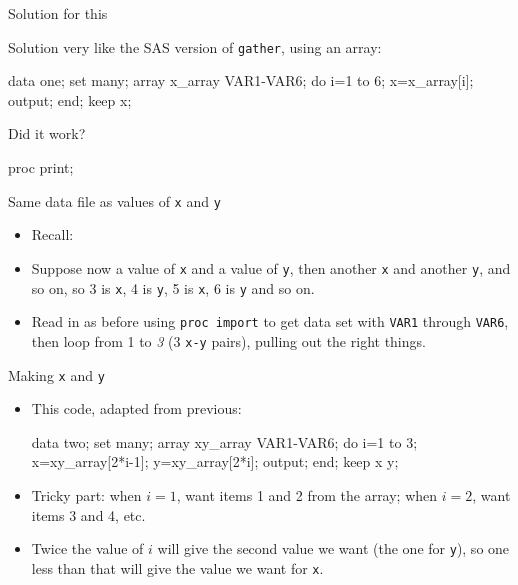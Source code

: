 \documentclass[unknownkeysallowed]{beamer}\usepackage[]{graphicx}\usepackage[]{color}
\begin{document}
\begin{frame}[fragile]{Solution for this}

  Solution very like the SAS version of \texttt{gather}, using an array:

  \begin{Datastep}
data one;
  set many;
  array x_array VAR1-VAR6;
  do i=1 to 6;
    x=x_array[i];
    output;
  end;
  keep x;
  \end{Datastep}

\end{frame}

\begin{frame}[fragile]{Did it work?}
    
    \begin{Sascode}[store=mb]
proc print;      
    \end{Sascode}
    
    
\end{frame}

\begin{frame}[fragile]{Same data file as values of \texttt{x} and \texttt{y}}
  
  \begin{itemize}
  \item   Recall:
  

\item Suppose now a value of \texttt{x} and a value of \texttt{y}, then
another \texttt{x} and another \texttt{y}, and so on, so 3 is
\texttt{x}, 4 is \texttt{y}, 5 is \texttt{x}, 6 is \texttt{y} and so on.

\item Read in as before using \texttt{proc import} to get data set
  with \texttt{VAR1} through \texttt{VAR6}, then loop from 1 to
  \emph{3} (3 \texttt{x-y} pairs), pulling out the right things.
  \end{itemize}

  
\end{frame}

\begin{frame}[fragile]{Making \texttt{x} and \texttt{y}}

  \begin{itemize}
  \item This code, adapted from previous:
        \begin{Datastep}
data two;
  set many;
  array xy_array VAR1-VAR6;
  do i=1 to 3;
    x=xy_array[2*i-1];
    y=xy_array[2*i];
    output;
  end;
  keep x y;
  \end{Datastep}
  
  \item Tricky part: when $i=1$, want items 1 and 2 from the array;
    when $i=2$, want items 3 and 4, etc. 
  \item Twice the value of $i$ will
    give the second value we want (the one for \texttt{y}), so one
    less than that will give the value we want for \texttt{x}.

  \end{itemize}

  
  
\end{frame}
\end{document}
